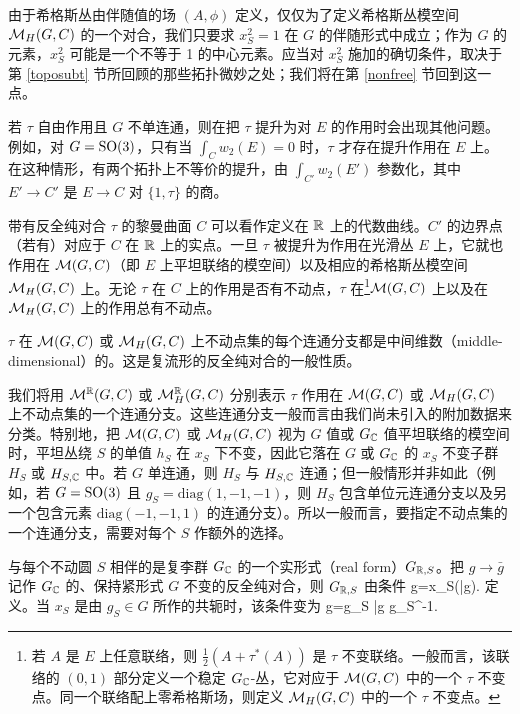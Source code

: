 由于希格斯丛由伴随值的场 $(A,\phi)$ 定义，仅仅为了定义希格斯丛模空间 ${\mathcal M}_H(G,C)$ 的一个对合，我们只要求 $x_S^2=1$ 在 $G$ 的伴随形式中成立；作为 $G$ 的元素，$x_S^2$ 可能是一个不等于 1 的中心元素。应当对 $x_S^2$ 施加的确切条件，取决于第 \ref{toposubt} 节所回顾的那些拓扑微妙之处；我们将在第 \ref{nonfree} 节回到这一点。

若 $\tau$ 自由作用且 $G$ 不单连通，则在把 $\tau$ 提升为对 $E$ 的作用时会出现其他问题。例如，对 $G={\mathrm{SO}}(3)$，只有当 $\int_C w_2(E)=0$ 时，$\tau$ 才存在提升作用在 $E$ 上。在这种情形，有两个拓扑上不等价的提升，由 $\int_{C'}w_2(E')$ 参数化，其中 $E'\to C'$ 是 $E\to C$ 对 $\{1,\tau\}$ 的商。

带有反全纯对合 $\tau$ 的黎曼曲面 $C$ 可以看作定义在 ${\mathbb R}$ 上的代数曲线。$C'$ 的边界点（若有）对应于 $C$ 在 ${\mathbb R}$ 上的实点。一旦 $\tau$ 被提升为作用在光滑丛 $E$ 上，它就也作用在 ${\mathcal M}(G,C)$（即 $E$ 上平坦联络的模空间）以及相应的希格斯丛模空间 ${\mathcal M}_H(G,C)$ 上。无论 $\tau$ 在 $C$ 上的作用是否有不动点，$\tau$ 在\footnote{若 $A$ 是 $E$ 上任意联络，则 $\frac{1}{2}(A+\tau^*(A))$ 是 $\tau$ 不变联络。一般而言，该联络的 $(0,1)$ 部分定义一个稳定 $G_{\mathbb C}$-丛，它对应于 ${\mathcal M}(G,C)$ 中的一个 $\tau$ 不变点。同一个联络配上零希格斯场，则定义 ${\mathcal M}_H(G,C)$ 中的一个 $\tau$ 不变点。}${\mathcal M}(G,C)$ 上以及在 ${\mathcal M}_H(G,C)$ 上的作用总有不动点。

$\tau$ 在 ${\mathcal M}(G,C)$ 或 ${\mathcal M}_H(G,C)$ 上不动点集的每个连通分支都是中间维数（middle-dimensional）的。这是复流形的反全纯对合的一般性质。

我们将用 ${\mathcal M}^{\mathbb R}(G,C)$ 或 ${\mathcal M}_H^{\mathbb R}(G,C)$ 分别表示 $\tau$ 作用在 ${\mathcal M}(G,C)$ 或 ${\mathcal M}_H(G,C)$ 上不动点集的一个连通分支。这些连通分支一般而言由我们尚未引入的附加数据来分类。特别地，把 ${\mathcal M}(G,C)$ 或 ${\mathcal M}_H(G,C)$ 视为 $G$ 值或 $G_{\mathbb C}$ 值平坦联络的模空间时，平坦丛绕 $S$ 的单值 $h_S$ 在 $x_S$ 下不变，因此它落在 $G$ 或 $G_{\mathbb C}$ 的 $x_S$ 不变子群 $H_S$ 或 $H_{S,{\mathbb C}}$ 中。若 $G$ 单连通，则 $H_S$ 与 $H_{S,{\mathbb C}}$ 连通；但一般情形并非如此（例如，若 $G={\mathrm{SO}}(3)$ 且 $g_S=\mathrm{diag}(1,-1,-1)$，则 $H_S$ 包含单位元连通分支以及另一个包含元素 $\mathrm{diag}(-1,-1,1)$ 的连通分支）。所以一般而言，要指定不动点集的一个连通分支，需要对每个 $S$ 作额外的选择。

与每个不动圆 $S$ 相伴的是复李群 $G_{\mathbb C}$ 的一个实形式（real form）$G_{{\mathbb R},S}$。把 $g\to \bar g$ 记作 $G_{\mathbb C}$ 的、保持紧形式 $G$ 不变的反全纯对合，则 $G_{{\mathbb R},S}$ 由条件
\be\label{ralform} g=x_S(\bar g). \ee
定义。当 $x_S$ 是由 $g_S\in G$ 所作的共轭时，该条件变为
\be\label{realform} g=g_S \bar g g_S^{-1}.\ee

